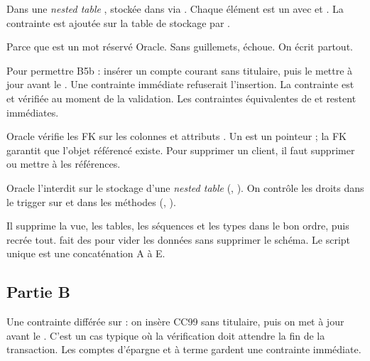{Dans une \emph{nested table} , stockée dans
 via .}
{Chaque élément est un  avec
 et . La contrainte
 est ajoutée sur la table de stockage par
.}

{Parce que  est un mot réservé Oracle.}
{Sans guillemets,  échoue. On écrit 
partout.}

{Pour permettre B5b : insérer un compte courant sans titulaire, puis le mettre
à jour avant le .}
{Une contrainte immédiate refuserait l'insertion. La contrainte
 est  et vérifiée au
moment de la validation. Les contraintes équivalentes de 
et  restent immédiates.}

{Oracle vérifie les FK sur les colonnes et attributs .}
{Un  est un pointeur ; la FK garantit que l'objet référencé existe.
Pour supprimer un client, il faut supprimer ou mettre à  les
références.}

{Oracle l'interdit sur le stockage d'une \emph{nested table}
(, ).}
{On contrôle les droits dans le trigger sur  et dans les
méthodes (, ).}

{Il supprime la vue, les tables, les séquences et les types dans le bon ordre,
puis recrée tout.}
{ fait des  pour vider les données sans
supprimer le schéma. Le script unique est une concaténation A à E.}

\subsection{Partie B}

{Une contrainte  différée sur  : on
insère CC99 sans titulaire, puis on met à jour avant le .}
{C'est un cas typique où la vérification doit attendre la fin de la
transaction. Les comptes d'épargne et à terme gardent une contrainte
immédiate.}

